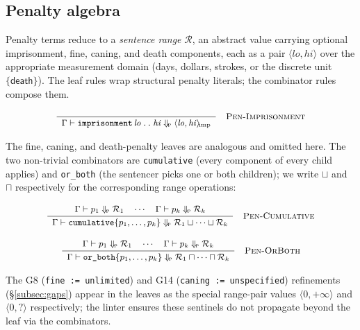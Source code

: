 \subsection{Penalty algebra}
\label{subsec:semantics-penalty}

Penalty terms reduce to a \emph{sentence range} $\mathcal{R}$, an
abstract value carrying optional imprisonment, fine, caning, and
death components, each as a pair $\langle \mathit{lo},
\mathit{hi} \rangle$ over the appropriate measurement domain
(days, dollars, strokes, or the discrete unit
$\{\textsf{death}\}$). The leaf rules wrap structural penalty
literals; the combinator rules compose them.

\begin{equation*}
\small
\inferrule[Pen-Imprisonment]
  { }
  {\Gamma \vdash \texttt{imprisonment}\,\mathit{lo}\,\texttt{..}\,
   \mathit{hi} \Downarrow_{\!\textsc{p}}
   \langle \mathit{lo}, \mathit{hi} \rangle_{\!\mathrm{imp}}}
\end{equation*}

The fine, caning, and death-penalty leaves are analogous and
omitted here. The two non-trivial combinators are
\texttt{cumulative} (every component of every child applies) and
\texttt{or\_both} (the sentencer picks one or both children); we
write $\sqcup$ and $\sqcap$ respectively for the corresponding
range operations:

\begin{equation*}
\small
\inferrule[Pen-Cumulative]
  {\Gamma \vdash p_1 \Downarrow_{\!\textsc{p}} \mathcal{R}_1
   \quad \cdots \quad
   \Gamma \vdash p_k \Downarrow_{\!\textsc{p}} \mathcal{R}_k}
  {\Gamma \vdash \texttt{cumulative}\{p_1, \ldots, p_k\}
   \Downarrow_{\!\textsc{p}}
   \mathcal{R}_1 \sqcup \cdots \sqcup \mathcal{R}_k}
\end{equation*}

\begin{equation*}
\small
\inferrule[Pen-OrBoth]
  {\Gamma \vdash p_1 \Downarrow_{\!\textsc{p}} \mathcal{R}_1
   \quad \cdots \quad
   \Gamma \vdash p_k \Downarrow_{\!\textsc{p}} \mathcal{R}_k}
  {\Gamma \vdash \texttt{or\_both}\{p_1, \ldots, p_k\}
   \Downarrow_{\!\textsc{p}}
   \mathcal{R}_1 \sqcap \cdots \sqcap \mathcal{R}_k}
\end{equation*}

The G8 (\texttt{fine := unlimited}) and G14
(\texttt{caning := unspecified}) refinements
(\S\ref{subsec:gaps}) appear in the leaves as the special
range-pair values $\langle 0, +\infty \rangle$ and
$\langle 0, ? \rangle$ respectively; the linter ensures these
sentinels do not propagate beyond the leaf via the combinators.


